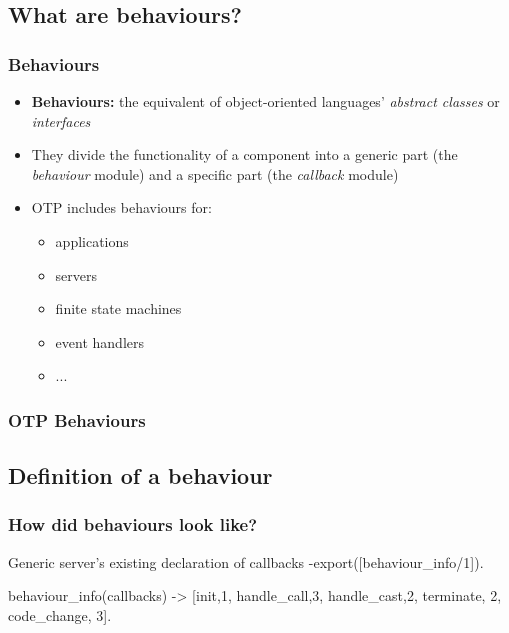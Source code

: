 \documentclass{beamer}
\begin{document}
\subsection{What are behaviours?}

\begin{frame}
  \frametitle{Behaviours}
  \begin{itemize}
  \item \textbf{Behaviours:} the equivalent of object-oriented
    languages' \emph{abstract classes} or \emph{interfaces} \pause
  \item They divide the functionality of a component into a generic
    part (the \emph{behaviour} module) and a specific part (the
    \emph{callback} module) \pause
  \item OTP includes behaviours for:
    \begin{itemize}
    \item applications
    \item servers
    \item finite state machines
    \item event handlers
    \item ...
    \end{itemize}
  \end{itemize}
\end{frame}

\begin{frame}
  \frametitle{OTP Behaviours}
  
\end{frame}

\subsection{Definition of a behaviour}

\begin{frame}[fragile]
  \frametitle{How did behaviours look like?}
\begin{code}{Generic server's existing declaration of callbacks}
-export([behaviour_info/1]).

behaviour_info(callbacks) ->
  [{init,1}, {handle_call,3}, {handle_cast,2},
   {terminate, 2}, {code_change, 3}].

\end{code}
\end{frame}
\end{document}
